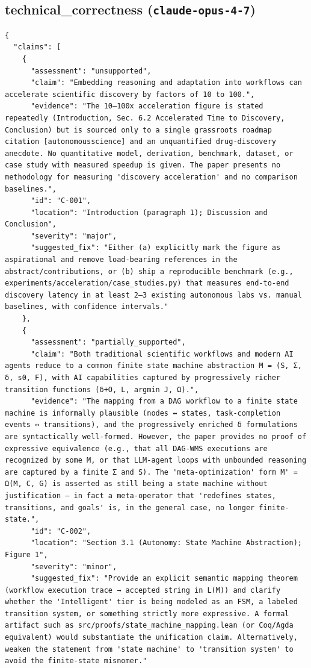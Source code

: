 \documentclass[11pt]{article}
\begin{document}
\subsection*{technical_correctness (\texttt{claude-opus-4-7})}
\begin{verbatim}
{
  "claims": [
    {
      "assessment": "unsupported",
      "claim": "Embedding reasoning and adaptation into workflows can accelerate scientific discovery by factors of 10 to 100.",
      "evidence": "The 10–100x acceleration figure is stated repeatedly (Introduction, Sec. 6.2 Accelerated Time to Discovery, Conclusion) but is sourced only to a single grassroots roadmap citation [autonomousscience] and an unquantified drug-discovery anecdote. No quantitative model, derivation, benchmark, dataset, or case study with measured speedup is given. The paper presents no methodology for measuring 'discovery acceleration' and no comparison baselines.",
      "id": "C-001",
      "location": "Introduction (paragraph 1); Discussion and Conclusion",
      "severity": "major",
      "suggested_fix": "Either (a) explicitly mark the figure as aspirational and remove load-bearing references in the abstract/contributions, or (b) ship a reproducible benchmark (e.g., experiments/acceleration/case_studies.py) that measures end-to-end discovery latency in at least 2–3 existing autonomous labs vs. manual baselines, with confidence intervals."
    },
    {
      "assessment": "partially_supported",
      "claim": "Both traditional scientific workflows and modern AI agents reduce to a common finite state machine abstraction M = (S, Σ, δ, s0, F), with AI capabilities captured by progressively richer transition functions (δ+O, L, argmin J, Ω).",
      "evidence": "The mapping from a DAG workflow to a finite state machine is informally plausible (nodes ↔ states, task-completion events ↔ transitions), and the progressively enriched δ formulations are syntactically well-formed. However, the paper provides no proof of expressive equivalence (e.g., that all DAG-WMS executions are recognized by some M, or that LLM-agent loops with unbounded reasoning are captured by a finite Σ and S). The 'meta-optimization' form M' = Ω(M, C, G) is asserted as still being a state machine without justification — in fact a meta-operator that 'redefines states, transitions, and goals' is, in the general case, no longer finite-state.",
      "id": "C-002",
      "location": "Section 3.1 (Autonomy: State Machine Abstraction); Figure 1",
      "severity": "minor",
      "suggested_fix": "Provide an explicit semantic mapping theorem (workflow execution trace → accepted string in L(M)) and clarify whether the 'Intelligent' tier is being modeled as an FSM, a labeled transition system, or something strictly more expressive. A formal artifact such as src/proofs/state_machine_mapping.lean (or Coq/Agda equivalent) would substantiate the unification claim. Alternatively, weaken the statement from 'state machine' to 'transition system' to avoid the finite-state misnomer."

\end{verbatim}
\end{document}
